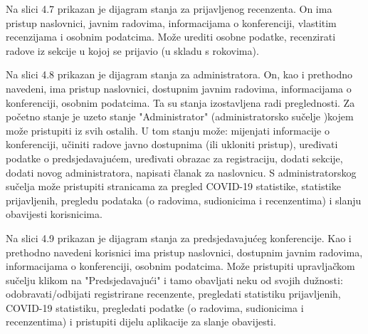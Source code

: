 			Na slici 4.7 prikazan je dijagram stanja za prijavljenog recenzenta. On ima pristup naslovnici,
			javnim radovima, informacijama o konferenciji, vlastitim recenzijama i osobnim podatcima. Može urediti osobne podatke, recenzirati radove iz sekcije u kojoj se prijavio (u skladu s rokovima).
			
			Na slici 4.8 prikazan je dijagram stanja za administratora. On, kao i prethodno navedeni, ima pristup naslovnici, dostupnim javnim radovima, informacijama o konferenciji, osobnim podatcima. Ta su stanja izostavljena radi preglednosti. Za početno stanje je uzeto stanje "Administrator" (administratorsko sučelje )kojem može pristupiti iz svih ostalih. U tom stanju može: mijenjati informacije o konferenciji, učiniti radove javno dostupnima (ili ukloniti pristup), uređivati podatke o predsjedavajućem, uređivati obrazac za registraciju, dodati sekcije, dodati novog administratora, napisati članak za naslovnicu. S administratorskog sučelja može pristupiti stranicama za pregled COVID-19 statistike, statistike prijavljenih, pregledu podataka (o radovima, sudionicima i recenzentima) i slanju obavijesti korisnicima.
			
			Na slici 4.9 prikazan je dijagram stanja za predsjedavajućeg konferencije. Kao i prethodno navedeni korisnici ima pristup naslovnici, dostupnim javnim radovima, informacijama o konferenciji, osobnim podatcima. Može pristupiti upravljačkom sučelju klikom na "Predsjedavajući" i tamo obavljati neku od svojih dužnosti: odobravati/odbijati registrirane recenzente, pregledati statistiku prijavljenih, COVID-19 statistiku, pregledati podatke (o radovima, sudionicima i recenzentima) i pristupiti dijelu aplikacije za slanje obavijesti.
			
